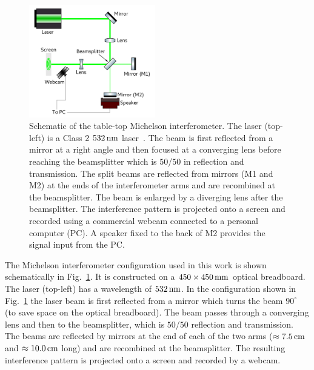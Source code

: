 \documentclass[paper-main.tex]{subfiles}
\begin{document}
\begin{figure}
	\includegraphics[width=0.49\textwidth]{figures/ifo_schematic_webcam_edit.pdf}
	\caption{\label{fig:ifo_schematic_webcam}
Schematic of the table-top Michelson interferometer. 
The laser (top-left) is a Class 2 $532\,{\rm nm}$ laser~\cite{ThorLabsIFO}. 
The beam is first reflected from a mirror at a right angle and then focused at a converging lens before reaching the beamsplitter which is $50$/$50$ in reflection and transmission. 
The split beams are reflected from mirrors (M1 and M2) at the ends of the interferometer arms and are recombined at the beamsplitter. 
The beam is enlarged by a diverging lens after the beamsplitter. 
The interference pattern is projected onto a screen and recorded using a commercial webcam connected to a personal computer (PC). 
A speaker fixed to the back of M2 provides the signal input from the PC.  
    }
\end{figure}


The Michelson interferometer configuration used in this work is shown schematically in Fig.~\ref{fig:ifo_schematic_webcam}.
It is constructed on a $450 \times 450 \,{\rm mm} $ optical breadboard. 
The laser (top-left) has a wavelength of $532\,{\rm nm}$.
In the configuration shown in Fig.~\ref{fig:ifo_schematic_webcam} the laser beam is first reflected from a mirror which turns the beam $90^{\circ}$ (to save space on the optical breadboard). 
The beam passes through a converging lens and then to the beamsplitter, which is $50$/$50$ reflection and transmission. 
The beams are reflected by mirrors at the end of each of the two arms ($\approx 7.5\,{\rm cm}$ and $\approx 10.0\,{\rm cm}$ long) and are recombined at the beamsplitter. 
The resulting interference pattern is projected onto a screen and recorded by a webcam. 
\end{document}
